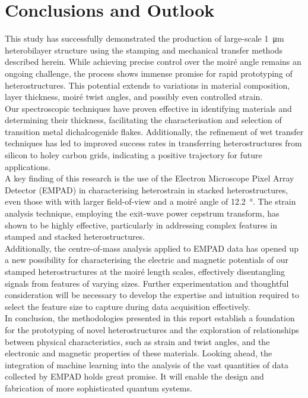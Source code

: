 \chapter{Conclusions and Outlook}
\label{sec:outlook}
This study has successfully demonstrated the production of large-scale \SI{1}{\micro\meter} heterobilayer structure using the stamping and mechanical transfer methods described herein. While achieving precise control over the moiré angle remains an ongoing challenge, the process shows immense promise for rapid prototyping of heterostructures. This potential extends to variations in material composition, layer thickness, moiré twist angles, and possibly even controlled strain.\\

Our spectroscopic techniques have proven effective in identifying materials and determining their thickness, facilitating the characterisation and selection of transition metal dichalcogenide flakes. Additionally, the refinement of wet transfer techniques has led to improved success rates in transferring heterostructures from silicon to holey carbon grids, indicating a positive trajectory for future applications.\\

A key finding of this research is the use of the Electron Microscope Pixel Array Detector (EMPAD) in characterising heterostrain in stacked heterostructures, even those with with larger field-of-view and a moiré angle of \SI{12.2}{\degree}. The strain analysis technique, employing the exit-wave power cepstrum transform, has shown to be highly effective, particularly in addressing complex features in stamped and stacked heterostructures. \\

Additionally, the centre-of-mass analysis applied to EMPAD data has opened up a new possibility for characterising the electric and magnetic potentials of our stamped heterostructures at the moiré length scales, effectively disentangling signals from features of varying sizes. Further experimentation and thoughtful consideration will be necessary to develop the expertise and intuition required to select the feature size to capture during data acquisition effectively.\\

In conclusion, the methodologies presented in this report establish a foundation for the prototyping of novel heterostructures and the exploration of relationships between physical characteristics, such as strain and twist angles, and the electronic and magnetic properties of these materials. Looking ahead, the integration of machine learning into the analysis of the vast quantities of data collected by EMPAD holds great promise. It will enable the design and fabrication of more sophisticated quantum systems.
